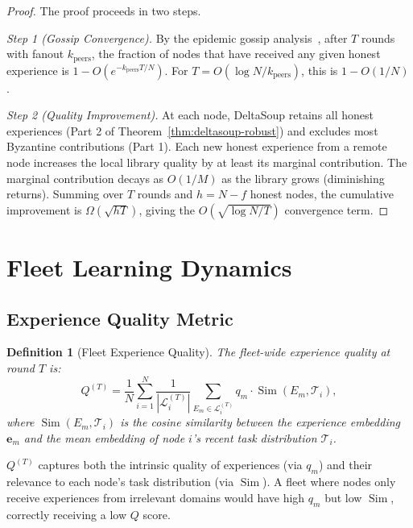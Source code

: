 \documentclass[11pt]{article}
\newtheorem{definition}{Definition}
\DeclareMathOperator{\Sim}{Sim}
\begin{document}
\begin{proof}
The proof proceeds in two steps.

\textit{Step 1 (Gossip Convergence).}
By the epidemic gossip analysis~\cite{demers1987epidemic}, after $T$ rounds
with fanout $k_{\text{peers}}$, the fraction of nodes that have received any
given honest experience is $1 - O(e^{-k_{\text{peers}} T / N})$. For $T =
O(\log N / k_{\text{peers}})$, this is $1 - O(1/N)$.

\textit{Step 2 (Quality Improvement).}
At each node, DeltaSoup retains all honest experiences (Part 2 of
Theorem~\ref{thm:deltasoup-robust}) and excludes most Byzantine contributions
(Part 1). Each new honest experience from a remote node increases the local
library quality by at least its marginal contribution. The marginal contribution
decays as $O(1/M)$ as the library grows (diminishing returns). Summing over $T$
rounds and $h = N - f$ honest nodes, the cumulative improvement is
$\Omega(\sqrt{hT})$, giving the $O(\sqrt{\log N / T})$ convergence term.
\end{proof}

\section{Fleet Learning Dynamics}
\label{sec:convergence}

\subsection{Experience Quality Metric}

\begin{definition}[Fleet Experience Quality]
\label{def:quality-metric}
The fleet-wide experience quality at round $T$ is:
\begin{equation}
    Q^{(T)} = \frac{1}{N} \sum_{i=1}^{N} \frac{1}{|\mathcal{L}_i^{(T)}|}
    \sum_{E_m \in \mathcal{L}_i^{(T)}} q_m \cdot \Sim(E_m, \mathcal{T}_i),
    \label{eq:fleet-quality}
\end{equation}
where $\Sim(E_m, \mathcal{T}_i)$ is the cosine similarity between the
experience embedding $\bm{e}_m$ and the mean embedding of node $i$'s
recent task distribution $\mathcal{T}_i$.
\end{definition}

$Q^{(T)}$ captures both the intrinsic quality of experiences (via $q_m$) and
their relevance to each node's task distribution (via $\Sim$). A fleet where
nodes only receive experiences from irrelevant domains would have high $q_m$
but low $\Sim$, correctly receiving a low $Q$ score.
\end{document}
